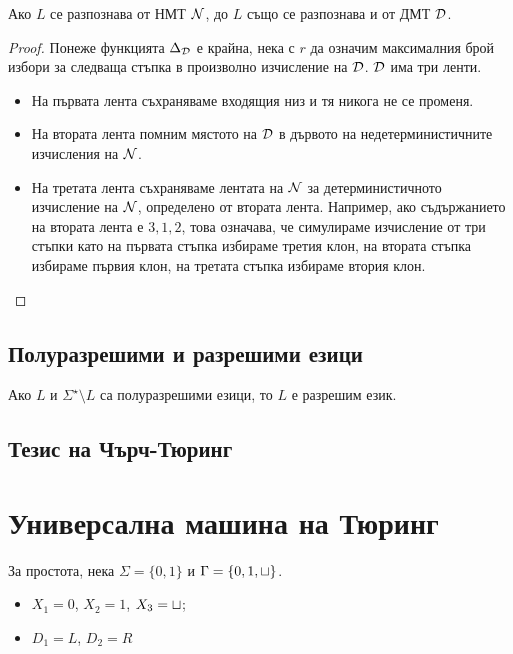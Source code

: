 \begin{thm}
  Ако $L$ се разпознава от НМТ $\mathcal{N}$, до $L$
  също се разпознава и от ДМТ $\mathcal{D}$.
\end{thm}
\begin{proof}
  Понеже функцията $\Delta_{\mathcal{D}}$ е крайна, нека с $r$ да означим 
  максималния брой избори за следваща стъпка в произволно изчисление на $\mathcal{D}$.
  $\mathcal{D}$ има три ленти.
  \begin{itemize}
  \item 
    На първата лента съхраняваме входящия низ и тя никога не се променя.
  \item
    На втората лента помним мястото на $\mathcal{D}$ в дървото на недетерминистичните изчисления на $\mathcal{N}$.  
  \item
    На третата лента съхраняваме лентата на $\mathcal{N}$ за детерминистичното изчисление на $\mathcal{N}$, 
    определено от втората лента. Например, ако съдържанието на втората лента е $3,1,2$,
    това означава, че симулираме изчисление от три стъпки като на първата стъпка избираме третия 
    клон, на втората стъпка избираме първия клон, на третата стъпка избираме втория клон.
  \end{itemize}
\end{proof}


\subsection*{Полуразрешими и разрешими езици}

\begin{thm}
  Ако $L$ и $\Sigma^\star \setminus L$ са полуразрешими езици, то $L$ е разрешим език.
\end{thm}




\subsection*{Тезис на Чърч-Тюринг}

\section{Универсална машина на Тюринг}
За простота, нека $\Sigma = \{0,1\}$ и $\Gamma = \{0,1,\sqcup\}$.
\begin{itemize}
\item 
  $X_1 = 0$, $X_2 = 1$, $X_3 = \sqcup$;
\item
  $D_1 = L$, $D_2 = R$
\end{itemize}

